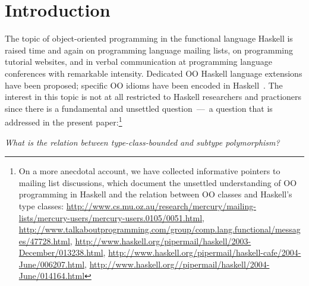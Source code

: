 \documentclass{jfp}
\begin{document}
\makeatactive

\newpage 

{

\footnotesize

\setcounter{tocdepth}{3}
\tableofcontents

}

\newpage






\section{Introduction}

The topic of object-oriented programming in the functional language
Haskell is raised time and again on programming language mailing
lists, on programming tutorial websites, and in verbal communication
at programming language conferences with remarkable
intensity. Dedicated OO Haskell language extensions have been
proposed; specific OO idioms have been encoded in
Haskell~\cite{HS95,GJ96,FLMPJ99, SPJ01,Nordlander02,MonadReader3}.
The interest in this topic is not at all restricted to Haskell
researchers and practioners since there is a fundamental and unsettled
question~---~a question that is addressed in the present paper:\footnote{On a more anecdotal account, we have collected
informative pointers to mailing list discussions, which document the
unsettled understanding of OO programming in Haskell and the relation
between OO classes and Haskell's type classes: {\scriptsize
\url{http://www.cs.mu.oz.au/research/mercury/mailing-lists/mercury-users/mercury-users.0105/0051.html},
\url{http://www.talkaboutprogramming.com/group/comp.lang.functional/messages/47728.html},
\url{http://www.haskell.org/pipermail/haskell/2003-December/013238.html},
\url{http://www.haskell.org/pipermail/haskell-cafe/2004-June/006207.html},
\url{http://www.haskell.org//pipermail/haskell/2004-June/014164.html}}}

\begin{center}\itshape
What is the relation between type-class-bounded and subtype polymorphism?
\end{center}
\end{document}
